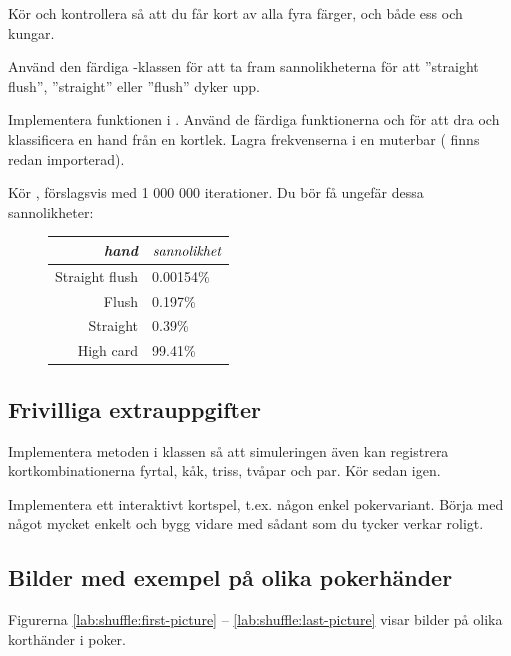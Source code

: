 \Subtask Kör  och kontrollera så att du får kort av alla fyra färger, och både ess och kungar.

\Task Använd den färdiga -klassen för att ta fram sannolikheterna för att  ''straight flush'', ''straight'' eller ''flush'' dyker upp.

\Subtask Implementera funktionen  i . Använd de färdiga funktionerna  och  för att dra och klassificera en hand från en kortlek. Lagra frekvenserna i en muterbar  ( finns redan importerad).

\Subtask Kör , förslagsvis med 1 000 000 iterationer. Du bör få ungefär dessa sannolikheter:
\begin{figure}[H]\centering
\begin{tabular}{r|l}
\emph{hand} & $\emph{sannolikhet}$ \\ \hline
Straight flush & 0.00154\%  \\
Flush          & 0.197\%    \\
Straight       & 0.39\%     \\
High card      & 99.41\%
\end{tabular}
\end{figure}


\subsection{Frivilliga extrauppgifter}

\Task Implementera metoden  i klassen  så att simuleringen även kan registrera kortkombinationerna fyrtal, kåk, triss, tvåpar och par. Kör sedan  igen.


\Task Implementera ett interaktivt kortspel, t.ex. någon enkel pokervariant. Börja med något mycket enkelt och bygg vidare med sådant som du tycker verkar roligt.



\subsection{Bilder med exempel på olika pokerhänder}

Figurerna \ref{lab:shuffle:first-picture} -- \ref{lab:shuffle:last-picture} visar bilder på olika korthänder i poker.

